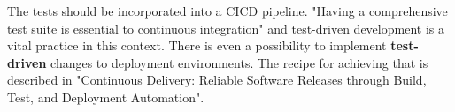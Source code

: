 The tests should be incorporated into a CICD pipeline. "Having a comprehensive test suite is essential to continuous integration" and test-driven development is a vital practice in this context\cite{book-cicd}. There is even a possibility to implement \textbf{test-driven} changes to deployment environments. The recipe for achieving that is described in "Continuous Delivery: Reliable Software Releases through Build, Test, and Deployment Automation"\cite{book-cicd}.
